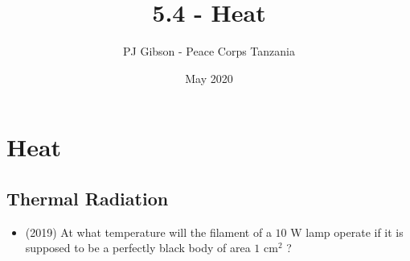 \documentclass{article}
\title{5.4 - Heat}
\author{PJ Gibson - Peace Corps Tanzania}
\date{May 2020}
\begin{document}
\maketitle


\section{Heat}

\subsection{Thermal Radiation}
\begin{itemize}
\item (2019)  At what temperature will the filament of a $ 10$ W lamp operate if it is supposed to be a perfectly black body of area  $ 1 $ cm$ ^{2}$ ? 
\end{itemize}
\end{document}
